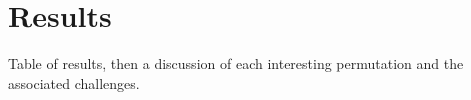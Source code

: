 \section{Results}
\label{chap:Results}

Table of results, then a discussion of each interesting permutation and the associated challenges.

